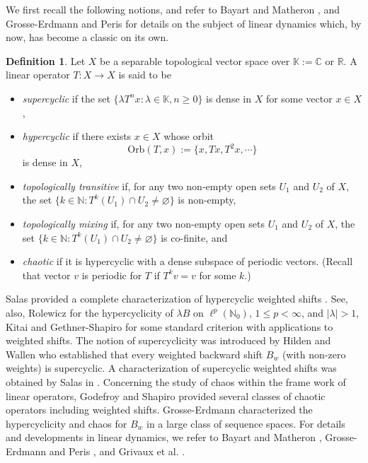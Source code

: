 \documentclass[12pt, reqno]{amsart}
\theoremstyle{definition}
\newtheorem{definition}[theorem]{Definition}
\theoremstyle{remark}
\numberwithin{equation}{section}
\begin{document}
We first recall the following notions, and refer to Bayart and Matheron \cite{Bayart-Matheron}, and Grosse-Erdmann and Peris \cite{Erdmann-Peris} for details on the subject of linear dynamics which, by now, has become a classic on its own. 

 \begin{definition}
 Let $X$ be a separable topological vector space over $\mathbb{K}:=\mathbb{C}$ or $\mathbb{R}$. A linear operator $T:X\rightarrow X$ is said to be
 \begin{itemize}\item[--] \textit{supercyclic} if the set 
 $\{\lambda T^nx:\lambda \in \mathbb{K}, n\geq 0\}$
 is dense in $X$ for some vector $x\in X$,
 \item[--] \textit{hypercyclic} if there exists $x\in X$ whose orbit
 \[
 \text{Orb}(T,x):=\{x,Tx,T^2x,\cdots\}
 \]
 is dense in $X$,
\item[--] \textit{topologically transitive} if, for any two non-empty open sets $U_1$ and $U_2$ of $X$, the set $\{k\in \mathbb{N}: T^k(U_1)\cap U_2\neq \varnothing\}$ is non-empty, 
\item[--] \textit{topologically mixing} if, for any two non-empty open sets $U_1$ and $U_2$ of $X$, the set $\{k\in \mathbb{N}: T^k(U_1)\cap U_2\neq \varnothing\}$ is co-finite, and 
\item[--] \textit{chaotic} if it is hypercyclic with a dense subspace of periodic vectors. (Recall that vector $v$ is periodic for $T$ if $T^kv=v$ for some $k$.)
 \end{itemize}
 \end{definition}








Salas provided a complete characterization of hypercyclic weighted shifts \cite{Salas-hc}. See, also, Rolewicz \cite{Rolewicz} for the hypercyclicity of $\lambda B$ on $\ell^p(\mathbb{N}_0)$, $1\leq p<\infty$, and $|\lambda|>1$, Kitai \cite{Kitai} and Gethner-Shapiro \cite{Gethner-Shapiro} for some standard criterion with applications to weighted shifts. The notion of supercyclicity was introduced by Hilden and Wallen \cite{Hilden-Wallen} who established that every weighted backward shift $B_w$ (with non-zero weights) is supercyclic. A characterization of supercyclic weighted shifts was obtained by Salas in \cite{Salas-sc}. Concerning the study of chaos within the frame work of linear operators, Godefroy and Shapiro \cite{Godefroy-Shapiro} provided several classes of chaotic operators including weighted shifts. Grosse-Erdmann \cite{Erdmann} characterized the hypercyclicity and chaos for $B_w$ in a large class of sequence spaces. For details and developments in linear dynamics, we refer to Bayart and Matheron \cite{Bayart-Matheron}, Grosse-Erdmann and Peris \cite{Erdmann-Peris}, and Grivaux et al. \cite{Grivaux}.
\end{document}
